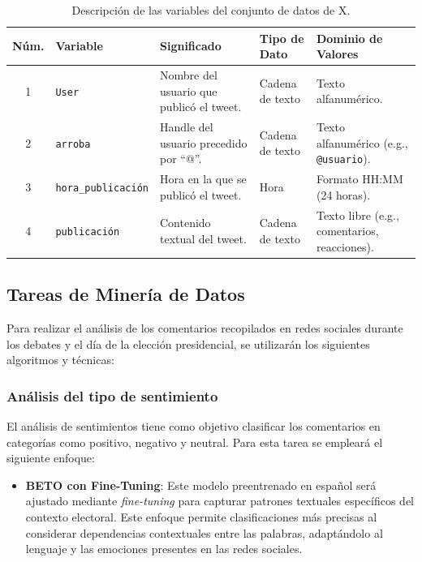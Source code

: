 \documentclass[10pt, a4paper]{article}
\begin{document}
	\begin{table}[h]
		\centering
		\begin{tabular}{|c|l|p{5cm}|l|p{4cm}|}
			\hline
			\textbf{Núm.} & \textbf{Variable} & \textbf{Significado} & \textbf{Tipo de Dato} & \textbf{Dominio de Valores} \\
			\hline
			1 & \texttt{User} & Nombre del usuario que publicó el tweet. & Cadena de texto & Texto alfanumérico. \\
			\hline
			2 & \texttt{arroba} & Handle del usuario precedido por ``@''. & Cadena de texto & Texto alfanumérico (e.g., \texttt{@usuario}). \\
			\hline
			3 & \texttt{hora\_publicación} & Hora en la que se publicó el tweet. & Hora & Formato HH:MM (24 horas). \\
			\hline
			4 & \texttt{publicación} & Contenido textual del tweet. & Cadena de texto & Texto libre (e.g., comentarios, reacciones). \\
			\hline
		\end{tabular}
		\caption{Descripción de las variables del conjunto de datos de X.}
		\label{tab:variables_dataset_X}
	\end{table}
	
	
	
	\subsection{Tareas de Minería de Datos}
	
	Para realizar el análisis de los comentarios recopilados en redes sociales durante los debates y el día de la elección presidencial, se utilizarán los siguientes algoritmos y técnicas:
	
	\subsubsection{Análisis del tipo de sentimiento}
	
	El análisis de sentimientos tiene como objetivo clasificar los comentarios en categorías como positivo, negativo y neutral. Para esta tarea se empleará el siguiente enfoque:
	
	\begin{itemize}
		\item \textbf{BETO con Fine-Tuning}: Este modelo preentrenado en español será ajustado mediante \textit{fine-tuning} para capturar patrones textuales específicos del contexto electoral. Este enfoque permite clasificaciones más precisas al considerar dependencias contextuales entre las palabras, adaptándolo al lenguaje y las emociones presentes en las redes sociales.
	\end{itemize}
	
\end{document}
